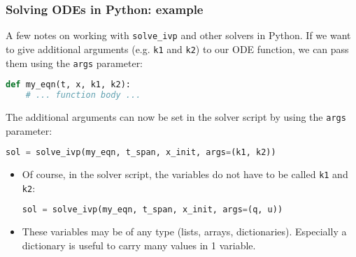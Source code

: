 \begin{frame}[fragile]
  \frametitle{Solving ODEs in Python: example}
  A few notes on working with \lstinline$solve_ivp$ and other solvers in Python. If we want to give additional arguments (e.g. \lstinline$k1$ and \lstinline$k2$) to our ODE function, we can pass them using the \lstinline$args$ parameter:
  \begin{lstlisting}[language=Python]
def my_eqn(t, x, k1, k2):
    # ... function body ...
\end{lstlisting}
  The additional arguments can now be set in the solver script by using the \lstinline$args$ parameter:
  \begin{lstlisting}[language=Python]
sol = solve_ivp(my_eqn, t_span, x_init, args=(k1, k2))
\end{lstlisting}
  \pause
  \begin{itemize}
    \item Of course, in the solver script, the variables do not have to be called \lstinline$k1$ and \lstinline$k2$:
      \begin{lstlisting}[language=Python]
sol = solve_ivp(my_eqn, t_span, x_init, args=(q, u))
\end{lstlisting}
    \item These variables may be of any type (lists, arrays, dictionaries). Especially a dictionary is useful to carry many values in 1 variable.
  \end{itemize}
\end{frame}

